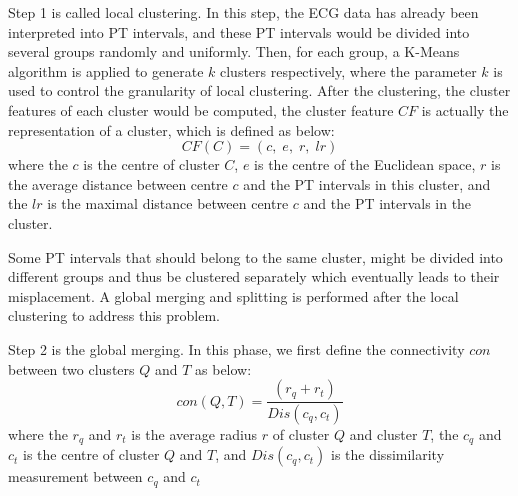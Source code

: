\documentclass[conference]{IEEEtran}
\begin{document}
Step 1 is called local clustering. In this step, the ECG data has already been interpreted into PT intervals, and these PT intervals would be divided into several groups randomly and uniformly. Then, for each group, a K-Means algorithm is applied to generate $ k $ clusters respectively, where the parameter $ k $ is used to control the granularity of local clustering. After the clustering, the cluster features of each cluster would be computed, the cluster feature $ CF $ is actually the representation of a cluster, which is defined as below:
\begin{equation}
CF(C) = (c, \; e, \; r, \; lr)
\end{equation} 
where the $ c $ is the centre of cluster $ C $, $ e $ is the centre of the Euclidean space, $ r $ is the average distance between centre $ c $ and the PT intervals in this cluster, and the $ lr $ is the maximal distance between centre $ c $ and the PT intervals in the cluster. 


Some PT intervals that should belong to the same cluster,  might be divided into different groups and thus be clustered separately which eventually leads to their misplacement. A global merging and splitting is performed after the local clustering to address this problem. 


Step 2 is the global merging. In this phase, we first define the connectivity $ con $ between two clusters $ Q $ and $ T $ as below:
\begin{equation}\label{eq_connectivity}
con(Q, T) = \frac{(r_q + r_t)}{Dis(c_q, c_t)} 
\end{equation}
where the $ r_q $ and $ r_t $ is the average radius $ r $ of cluster $ Q $ and cluster $ T $, the $ c_q $ and $ c_t $ is the centre of cluster $ Q $ and $ T $, and $ Dis(c_q, c_t) $ is the dissimilarity measurement between $ c_q $ and $ c_t $
\end{document}
